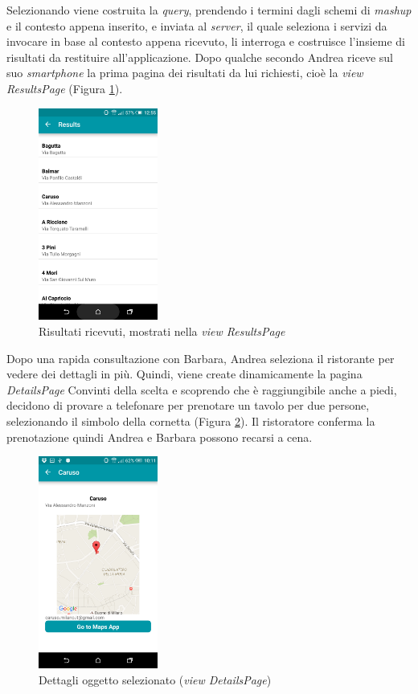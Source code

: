Selezionando  viene costruita la \emph{query}, prendendo i termini dagli schemi di \emph{mashup} e il contesto appena inserito, e inviata al \emph{server}, il quale seleziona i servizi da invocare in base al contesto appena ricevuto, li interroga e costruisce l'insieme di risultati da restituire all'applicazione. Dopo qualche secondo Andrea riceve sul suo \emph{smartphone} la prima pagina dei risultati da lui richiesti, cioè la \textit{view} \emph{ResultsPage} (Figura \ref{fig:usecase-results}).

\begin{figure}[H]
	\centering
	\includegraphics[width=0.35\textwidth]{4-progettazione-alto-livello/Immagini/results_caso_d'uso.png}
	\caption{Risultati ricevuti, mostrati nella \emph{view ResultsPage}}\label{fig:usecase-results}
\end{figure} 

Dopo una rapida consultazione con Barbara, Andrea seleziona il ristorante  per vedere dei dettagli in più. Quindi, viene create dinamicamente la pagina \emph{DetailsPage} Convinti della scelta e scoprendo che è raggiungibile anche a piedi, decidono di provare a telefonare per prenotare un tavolo per due persone, selezionando il simbolo della cornetta (Figura \ref{fig:usecase-details}). Il ristoratore conferma la prenotazione quindi Andrea e Barbara possono recarsi a cena. %

\begin{figure}[H]
	\centering
	\includegraphics[width=0.35\textwidth]{4-progettazione-alto-livello/Immagini/details_caso_d'uso.png}
	\caption{Dettagli oggetto selezionato (\emph{view DetailsPage})}\label{fig:usecase-details}
\end{figure} 